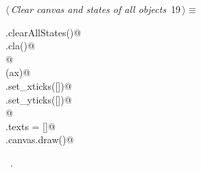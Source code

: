 \documentclass[12pt]{report}
\begin{document}
\begin{flushleft} \small
\begin{minipage}{\linewidth}\label{scrap7}\raggedright\small
{} $\langle\,${\itshape Clear canvas and states of all objects}\nobreak\ {\footnotesize {19}}$\,\rangle\equiv$
\vspace{-1ex}
\begin{list}{}{} \item
\mbox{}\verb@run.clearAllStates()@\\
\mbox{}\verb@ax.cla()@\\
\mbox{}\verb@              @\\
\mbox{}\verb@applyAxCorrection(ax)@\\
\mbox{}\verb@ax.set_xticks([])@\\
\mbox{}\verb@ax.set_yticks([])@\\
\mbox{}\verb@                 @\\
\mbox{}\verb@fig.texts = []@\\
\mbox{}\verb@fig.canvas.draw()@\\
\mbox{}\verb@@{\NWsep}
\end{list}
\vspace{-1.5ex}
\footnotesize
\begin{list}{}{\setlength{\itemsep}{-\parsep}\setlength{\itemindent}{-\leftmargin}}
\item \NWtxtMacroRefIn\ .

\item{}
\end{list}
\end{minipage}\vspace{4ex}
\end{flushleft}
\newchunk 
\end{document}
